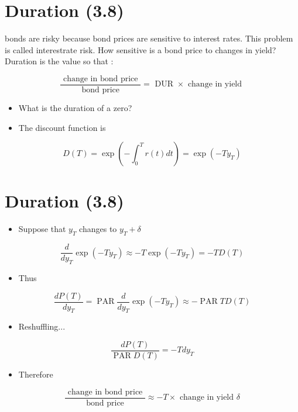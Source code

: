 \documentclass[letterpaper]{article}
\begin{document}
\section*{Duration (3.8)}
bonds are risky because bond prices are sensitive to interest rates. This problem is called interestrate risk. How sensitive is a bond price to changes in yield? Duration is the value so that :

$$
\frac{\text { change in bond price }}{\text { bond price }}=\text { DUR } \times \text { change in yield }
$$

\begin{itemize}
  \item What is the duration of a zero?
  \item The discount function is
\end{itemize}

$$
D(T)=\exp \left(-\int_{0}^{T} r(t) d t\right)=\exp \left(-T y_{T}\right)
$$

\section*{Duration (3.8)}
\begin{itemize}
  \item Suppose that $y_{T}$ changes to $y_{T}+\delta$
\end{itemize}

$$
\frac{d}{d y_{T}} \exp \left(-T y_{T}\right) \approx-T \exp \left(-T y_{T}\right)=-T D(T)
$$

\begin{itemize}
  \item Thus
\end{itemize}

$$
\frac{d P(T)}{d y_{T}}=\operatorname{PAR} \frac{d}{d y_{T}} \exp \left(-T y_{T}\right) \approx-\operatorname{PAR} T D(T)
$$

\begin{itemize}
  \item Reshuffling...
\end{itemize}

$$
\frac{d P(T)}{\operatorname{PAR} D(T)}=-T d y_{T}
$$

\begin{itemize}
  \item Therefore
\end{itemize}

$$
\frac{\text { change in bond price }}{\text { bond price }} \approx-T \times \text { change in yield } \delta
$$
\end{document}
